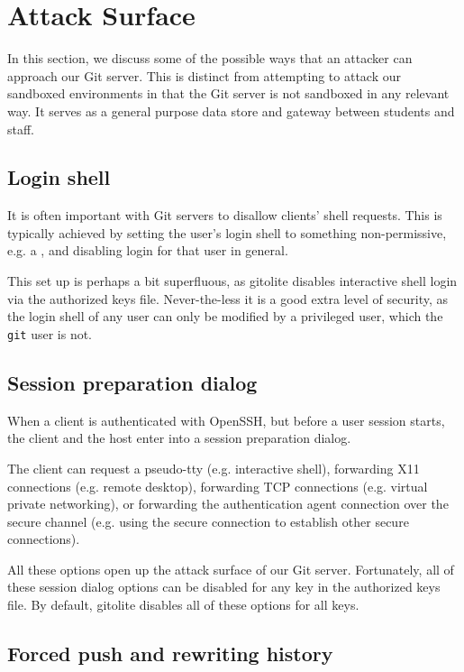 
\section{Attack Surface}

In this section, we discuss some of the possible ways that an attacker can
approach our Git server.  This is distinct from attempting to attack our
sandboxed environments in that the Git server is not sandboxed in any relevant
way. It serves as a general purpose data store and gateway between students and
staff.

\subsection{Login shell}

It is often important with Git servers to disallow clients' shell requests.
This is typically achieved by setting the user's login shell to something
non-permissive, e.g. a \cite{man-1-git-shell}, and disabling login for that
user in general.

This set up is perhaps a bit superfluous, as gitolite disables interactive
shell login via the authorized keys file. Never-the-less it is a good extra
level of security, as the login shell of any user can only be modified by a
privileged user, which the \texttt{git} user is not.

\subsection{Session preparation dialog}

When a client is authenticated with OpenSSH, but before a user session starts,
the client and the host enter into a session preparation dialog.

The client can request a pseudo-tty (e.g. interactive shell), forwarding X11
connections (e.g. remote desktop), forwarding TCP connections (e.g. virtual
private networking), or forwarding the authentication agent connection over the
secure channel (e.g. using the secure connection to establish other secure
connections).

All these options open up the attack surface of our Git server. Fortunately,
all of these session dialog options can be disabled for any key in the
authorized keys file\cite{man-8-sshd}. By default, gitolite disables all of
these options for all keys.

\subsection{Forced push and rewriting history}\label{section:forced-push}


